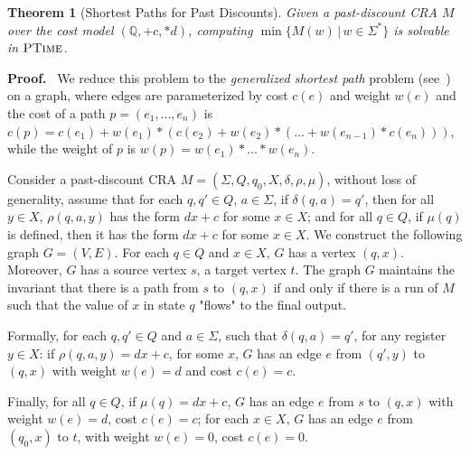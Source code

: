 \documentclass[11pt]{article}
\newtheorem{theorem}{Theorem}
\def\Proof{{\bf Proof.}}
\newcommand{\Rat}{\ensuremath{\mathbb{Q}}}
\newcommand{\sep}{\ensuremath{\,|\,}}
\newcommand{\inputalph}{\ensuremath{\Sigma}}
\newcommand{\state}{\ensuremath{q}}
\newcommand{\fm}[1]{\ensuremath{#1^{*}}}
\newcommand{\valuation}{\ensuremath{\nu}}
\newcommand{\ptime}{\ensuremath{\sc\textsc{PTime}}\xspace}
\newcommand{\edwa}{\ensuremath{M}}
\newcommand{\edwastates}{\ensuremath{Q}}
\newcommand{\edwastate}{\ensuremath{q}}
\newcommand{\edwainitst}{\ensuremath{\edwastate_0}}
\newcommand{\edwavariables}{\ensuremath{X}}
\newcommand{\edwatrans}{\ensuremath{\delta}}
\newcommand{\edwavarup}{\ensuremath{\rho}}
\newcommand{\edwafinal}{\ensuremath{\mu}}
\newcommand{\loris}[1]{}
\begin{document}
\newcommand{\fp}{f_{pd}}
\newcommand{\ff}{f_{fd}}

\begin{theorem}[Shortest Paths for Past Discounts]
Given a past-discount CRA $\edwa$ over the cost model
$(\Rat,+c,*d)$, computing $\min\{\edwa(w)\sep w\in\fm\Sigma\}$ is
solvable in $\ptime$.
\end{theorem}
\Proof~
We reduce this problem to the {\em generalized shortest path\/}
 problem (see~\cite{batagelj_generalized_2000,oldham_combinatorial_1999}) on a graph, where edges are parameterized
 by cost $c(e)$ and weight $w(e)$ and the cost of a path $p=(e_1,\ldots,e_n)$ is
$c(p)=c(e_1)+w(e_1)*(c(e_2)+w(e_2)*(\ldots+w(e_{n-1})*c(e_{n})))$, while the weight of $p$ is $w(p)=w(e_1)*\ldots*w(e_n)$.

Consider a past-discount CRA $\edwa = (\inputalph, \edwastates, \edwainitst, \edwavariables, \edwatrans, \edwavarup, \edwafinal)$,
without loss of generality, assume that for each $\state,\state'\in \edwastates$, $a\in \inputalph$, if $\edwatrans(\state,a)=\state'$, then
for all $y\in \edwavariables$, $\edwavarup(\state,a,y)$ has the form $dx+c$ for some $x\in \edwavariables$; and for all $\state \in \edwastates$,
if $\edwafinal(\state)$ is defined, then it has the form $dx+c$ for some $x\in \edwavariables$.
We construct the following graph $G=(V,E)$. For each $\state \in \edwastates$ and $x \in \edwavariables$, $G$ has a vertex $(\state,x)$.
Moreover, $G$ has a source vertex $s$, a target vertex $t$. The graph $G$ maintains the invariant that
there is a path from $s$ to $(\state, x)$ if and only if there is a run of $M$ such that the value of $x$ in state $\state$ "flows" to the
final output.
\loris{This invariant is too informal, you should say something like:
The graph $G$ maintains the invariant that
there is a path $p$ from $s$ to $(\state, x)$
if and only if there exists a string $s\in\Sigma$
such that $M$ on $s$ reaches the configuration $(q,\valuation)$
and $\valuation(x)=c(p)$ (or something like that).
}
Formally, for each $\state,\state' \in \edwastates$ and $a\in \inputalph$, such that
$\edwatrans(\state,a)=\state'$, for any register $y\in \edwavariables$:
if $\edwavarup(\state,a,y)=dx+c$, for some $x$, $G$ has an
edge $e$ from $(\state',y)$ to $(\state,x)$ with weight $w(e)=d$ and  cost $c(e)=c$.

Finally,
for all $\state\in \edwastates$, if $\edwafinal(\state)=dx+c$, $G$ has
an edge $e$ from $s$ to $(\state,x)$ with weight $w(e)=d$, cost $c(e)=c$;
for each $x\in \edwavariables$, $G$ has an edge $e$ from $(\edwainitst,x)$ to $t$,  with weight $w(e)=0$, cost $c(e)=0$.
\end{document}
